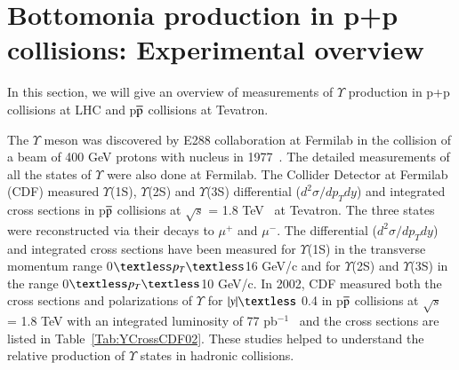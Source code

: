 \section{Bottomonia production in p+p collisions: Experimental overview}


 In this section, we will give an overview of measurements of $\Upsilon$
production in p+p collisions at LHC and p$\overline{\rm p}$ collisions at Tevatron. 


The $\Upsilon$ meson was discovered by E288 collaboration at Fermilab in the collision of
a beam of 400 GeV protons with nucleus in 1977~\cite{PhysRevLett.39.252}.
The detailed measurements of all the states of $\Upsilon$ were also done at Fermilab.
The Collider Detector at Fermilab (CDF) measured $\Upsilon$(1S), $\Upsilon$(2S) and $\Upsilon$(3S) 
differential ($d^{2}\sigma/dp_{T}dy$) and integrated cross sections in p$\overline{\rm p}$
collisions at $\surd s$ = 1.8 TeV~\cite{CDF:1995gwi} at Tevatron.
The three states were reconstructed via their decays 
to $\mu^{+}$ and $\mu^{-}$. The differential ($d^{2}\sigma/dp_{T}dy$) and integrated
cross sections have been measured for  $\Upsilon$(1S) in the transverse momentum range
0$\textless p_{T} \textless$16 GeV/c and for $\Upsilon$(2S) and $\Upsilon$(3S)
in the range 0$\textless p_{T}\textless$10 GeV/c.
  In 2002, CDF measured both the cross sections and polarizations of $\Upsilon$
for $|y|\textless$ 0.4 in p$\overline{\rm p}$ collisions at $\surd s$ = 1.8 TeV with
an integrated luminosity of 77 pb$^{-1}$~\cite{CDF:2001fdy} and the cross sections are
listed in Table~\ref{Tab:YCrossCDF02}. These studies helped to understand the
relative production of $\Upsilon$ states in hadronic collisions. 





